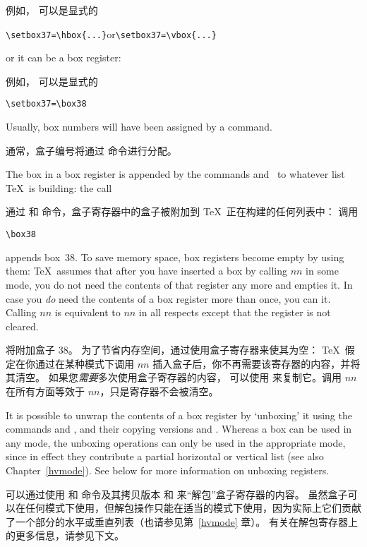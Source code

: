 例如， 可以是显式的
\begin{Disp}\verb>\setbox37=\hbox{...}>\quad or\quad \verb>\setbox37=\vbox{...}>
\end{Disp}
or it can be a box register:

例如， 可以是显式的
\begin{verbatim}
\setbox37=\box38
\end{verbatim}
Usually, box numbers will have been assigned by a 
command.

通常，盒子编号将通过  命令进行分配。


The box in a box register is appended
by the commands  and~
to whatever list \TeX\ is building: the call

通过  和  命令，盒子寄存器中的盒子被附加到 \TeX\ 正在构建的任何列表中：
调用
\begin{verbatim}
\box38
\end{verbatim}
appends box~38.
To save memory space, box registers become empty by using them:
\TeX\ assumes that after you have inserted a box by
calling $nn$ in some mode, you do not need the
contents of that register any more and empties it.
In case you {\em do\/} need the contents of
a box register more than once, 
you can  it. Calling $nn$ is
equivalent to $nn$ in all respects except that
the register is not cleared.

将附加盒子 38。
为了节省内存空间，通过使用盒子寄存器来使其为空：
\TeX\ 假定在你通过在某种模式下调用 $nn$ 插入盒子后，你不再需要该寄存器的内容，并将其清空。
如果您{\em 需要}多次使用盒子寄存器的内容，
可以使用  来复制它。调用 $nn$ 在所有方面等效于 $nn$，只是寄存器不会被清空。

It is possible to unwrap the contents of a box register
by `unboxing' it using the commands  and ,
and their copying versions  and .
Whereas a box can be used in any mode, the
unboxing operations can only be used in the appropriate mode,
since in effect they contribute a partial
horizontal or vertical list (see also Chapter~\ref{hvmode}).
See below for more information on unboxing registers.
\awp

可以通过使用  和  命令及其拷贝版本  和  来“解包”盒子寄存器的内容。
虽然盒子可以在任何模式下使用，但解包操作只能在适当的模式下使用，因为实际上它们贡献了一个部分的水平或垂直列表（也请参见第~\ref{hvmode} 章）。
有关在解包寄存器上的更多信息，请参见下文。
\awp

